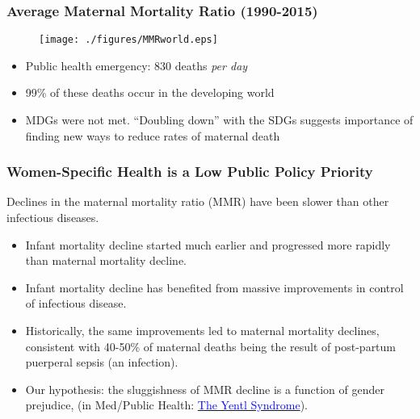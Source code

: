 \documentclass[10pt,letterpaper,subeqn]{beamer}
\begin{document}
\begin{frame}[label=MMRmap]
\frametitle{Average Maternal Mortality Ratio (1990-2015)}
\begin{figure}[h!]
\centering
\texttt{[image: ./figures/MMRworld.eps]}
\end{figure}
\begin{itemize}
\item Public health emergency: 830 deaths \emph{per day}
\item 99\% of these deaths occur in the developing world
\item MDGs were not met.  ``Doubling down'' with the SDGs suggests
  importance of finding new ways to reduce rates of maternal death
\end{itemize}
\end{frame}

\begin{frame}
\frametitle{Women-Specific Health is a Low Public Policy Priority}
  Declines in the maternal mortality ratio (MMR) have been slower than other infectious diseases. \vspace{4mm}
\begin{itemize}
  \setlength{\itemsep}{10pt}
	\item Infant mortality decline started much earlier and progressed more rapidly 
        than maternal mortality decline.
	\item Infant mortality decline has benefited from massive improvements in 
        control of infectious disease. 
	\item Historically, the same improvements led to maternal mortality declines, 
        consistent with 40-50\% of maternal deaths being the result of post-partum
        puerperal sepsis (an infection).
  \item Our hypothesis: the sluggishness of MMR decline is a function of gender 
        prejudice, (in Med/Public Health: \hyperlink{Yentl}{\textcolor{blue}
        {The Yentl Syndrome}}).
\end{itemize}
\end{frame}
\end{document}
